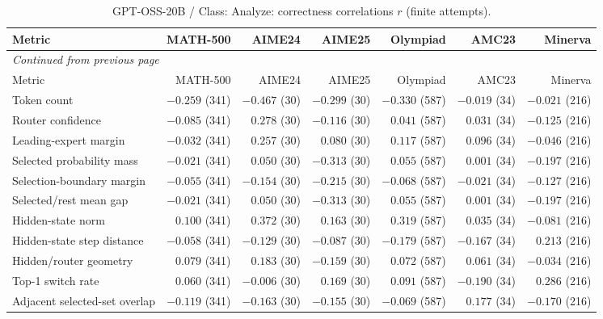 \begingroup\scriptsize\setlength{\tabcolsep}{4pt}
\begin{longtable}{@{}lrrrrrr@{}}
\caption{GPT-OSS-20B / Class: Analyze: correctness correlations $r$ (finite attempts).}\label{tab:multi-gptoss-class-Analyze}\\
\toprule
Metric & MATH-500 & AIME24 & AIME25 & Olympiad & AMC23 & Minerva \\
\midrule\endfirsthead
\multicolumn{7}{l}{\textit{Continued from previous page}}\\
\toprule
Metric & MATH-500 & AIME24 & AIME25 & Olympiad & AMC23 & Minerva \\
\midrule\endhead
\bottomrule\endfoot
Token count & $-0.259$ (341) & $-0.467$ (30) & $-0.299$ (30) & $-0.330$ (587) & $-0.019$ (34) & $-0.021$ (216) \\
Router confidence & $-0.085$ (341) & $0.278$ (30) & $-0.116$ (30) & $0.041$ (587) & $0.031$ (34) & $-0.125$ (216) \\
Leading-expert margin & $-0.032$ (341) & $0.257$ (30) & $0.080$ (30) & $0.117$ (587) & $0.096$ (34) & $-0.046$ (216) \\
Selected probability mass & $-0.021$ (341) & $0.050$ (30) & $-0.313$ (30) & $0.055$ (587) & $0.001$ (34) & $-0.197$ (216) \\
Selection-boundary margin & $-0.055$ (341) & $-0.154$ (30) & $-0.215$ (30) & $-0.068$ (587) & $-0.021$ (34) & $-0.127$ (216) \\
Selected/rest mean gap & $-0.021$ (341) & $0.050$ (30) & $-0.313$ (30) & $0.055$ (587) & $0.001$ (34) & $-0.197$ (216) \\
Hidden-state norm & $0.100$ (341) & $0.372$ (30) & $0.163$ (30) & $0.319$ (587) & $0.035$ (34) & $-0.081$ (216) \\
Hidden-state step distance & $-0.058$ (341) & $-0.129$ (30) & $-0.087$ (30) & $-0.179$ (587) & $-0.167$ (34) & $0.213$ (216) \\
Hidden/router geometry & $0.079$ (341) & $0.183$ (30) & $-0.159$ (30) & $0.072$ (587) & $0.061$ (34) & $-0.034$ (216) \\
Top-1 switch rate & $0.060$ (341) & $-0.006$ (30) & $0.169$ (30) & $0.091$ (587) & $-0.190$ (34) & $0.286$ (216) \\
Adjacent selected-set overlap & $-0.119$ (341) & $-0.163$ (30) & $-0.155$ (30) & $-0.069$ (587) & $0.177$ (34) & $-0.170$ (216) \\
\end{longtable}\endgroup

